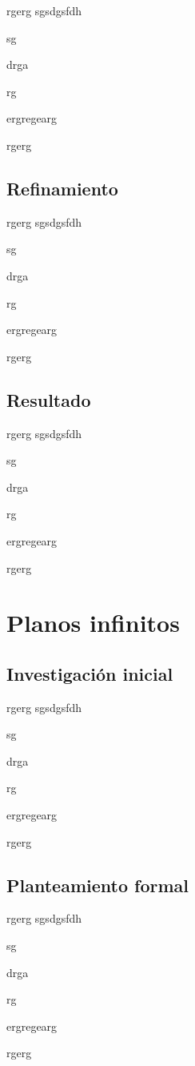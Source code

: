 rgerg
sgsdgsfdh

sg

drga

rg

ergregearg

rgerg

\subsection{Refinamiento}

rgerg
sgsdgsfdh

sg

drga

rg

ergregearg

rgerg

\subsection{Resultado}

rgerg
sgsdgsfdh

sg

drga

rg

ergregearg

rgerg


\section{Planos infinitos}

\subsection{Investigación inicial}

rgerg
sgsdgsfdh

sg

drga

rg

ergregearg

rgerg

\subsection{Planteamiento formal}

rgerg
sgsdgsfdh

sg

drga

rg

ergregearg

rgerg

